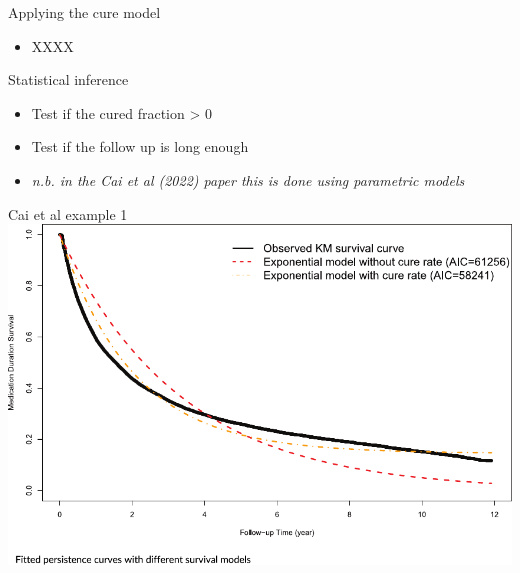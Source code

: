 \documentclass[aspectratio=169,12pt]{beamer} %
\begin{document}
\begin{frame}{Applying the cure model}
	\begin{itemize}
		\item XXXX
	\end{itemize}
\end{frame}

\begin{frame}{Statistical inference}
    \begin{itemize}
        \item Test if the cured fraction > 0
	\item Test if the follow up is long enough
	\item \emph{n.b. in the Cai et al (2022) paper this is done using parametric models}
    \end{itemize}
\end{frame}

\begin{frame}{Cai et al example 1}
  \centering
  \includegraphics[height=0.7\textheight]{ref/cai_fig2.pdf}
\end{frame}
\end{document}
